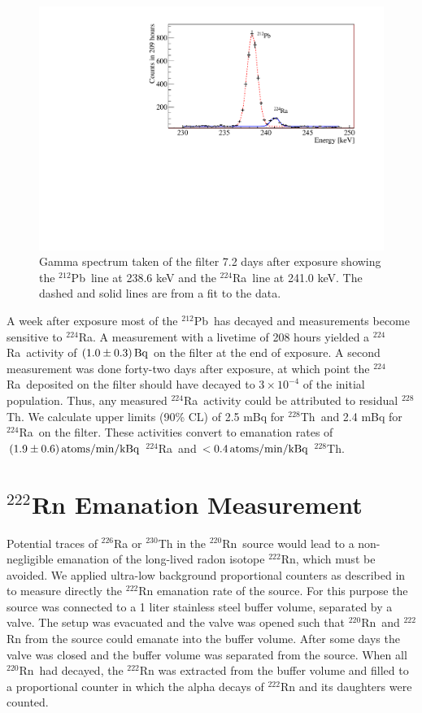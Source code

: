 \begin{figure}[htb]
\centering
    \includegraphics[trim = 15 0 50 20, clip = true,width = 0.8\columnwidth]{figures/rnsource/ge_spectrum}
    \caption{Gamma spectrum taken of the filter 7.2 days after exposure showing the $^{212}$Pb~line at 238.6 keV and the $^{224}$Ra~line at 241.0 keV. The dashed and solid lines are from a fit to the data.}\label{fig:gammaspectrum}
\end{figure}

A week after exposure most of the $^{212}$Pb~has decayed and measurements become sensitive to $^{224}$Ra. A measurement with a livetime of 208 hours yielded a $^{224}$Ra~activity of $(1.0\pm0.3)\,\mathrm{Bq}$ on the filter at the end of exposure. A second measurement was done forty-two days after exposure, at which point the $^{224}$Ra~deposited on the filter should have decayed to $3\times10^{-4}$ of the initial population. Thus, any measured $^{224}$Ra~activity could be attributed to residual $^{228}$Th. We calculate upper limits (90\% CL) of 2.5 mBq for $^{228}$Th~and 2.4 mBq for $^{224}$Ra~on the filter. These activities convert to emanation rates of $(1.9\pm0.6)\,\mathrm{atoms/min/kBq}$ $^{224}$Ra~and $<0.4\,\mathrm{atoms/min/kBq}$ $^{228}$Th.

\section{$^{222}$Rn Emanation Measurement}

Potential traces of $^{226}$Ra or $^{230}$Th in the $^{220}$Rn~source would lead to a non-negligible emanation of the long-lived radon isotope $^{222}$Rn, which must be avoided. We applied ultra-low background proportional counters as described in~\cite{Zuzel:2009} to measure directly the $^{222}$Rn emanation rate of the source. For this purpose the source was connected to a 1 liter stainless steel buffer volume, separated by a valve. The setup was evacuated and the valve was opened such that $^{220}$Rn~and $^{222}$Rn from the source could emanate into the buffer volume. After some days the valve was closed and the buffer volume was separated from the source. When all $^{220}$Rn~had decayed, the $^{222}$Rn was extracted from the buffer volume and filled to a proportional counter in which the alpha decays of $^{222}$Rn and its daughters were counted.

